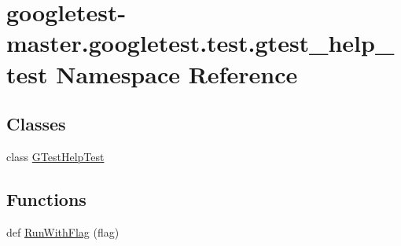 \hypertarget{namespacegoogletest-master_1_1googletest_1_1test_1_1gtest__help__test}{}\section{googletest-\/master.googletest.\+test.\+gtest\+\_\+help\+\_\+test Namespace Reference}
\label{namespacegoogletest-master_1_1googletest_1_1test_1_1gtest__help__test}
\subsection*{Classes}
\begin{DoxyCompactItemize}
\item 
class \mbox{\hyperlink{classgoogletest-master_1_1googletest_1_1test_1_1gtest__help__test_1_1_g_test_help_test}{G\+Test\+Help\+Test}}
\end{DoxyCompactItemize}
\subsection*{Functions}
\begin{DoxyCompactItemize}
\item 
def \mbox{\hyperlink{namespacegoogletest-master_1_1googletest_1_1test_1_1gtest__help__test_a91837c8d06174e359cbc7f0b063f478f}{Run\+With\+Flag}} (flag)
\end{DoxyCompactItemize}
